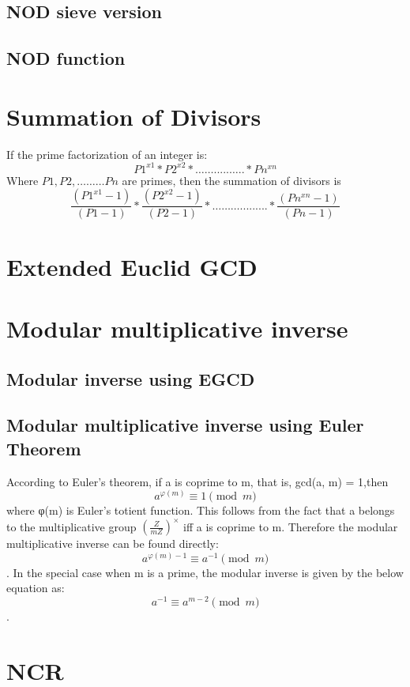 \documentclass[11pt]{report}
\begin{document}
\subsection{NOD sieve version}

\subsection{NOD function}

\section{Summation of Divisors}
If the prime factorization of an integer is:
		$$P1^{x1}*P2^{x2}*…….....…..*Pn^{xn}$$
Where $P1,P2,………Pn$ are primes, then the summation of divisors is
		$$\frac{(P1^{x1}  -1)}{(P1-1)} * \frac{(P2^{x2}  -1)}{(P2-1)} *………......... *\frac{(Pn^{xn}  -1)}{(Pn-1)}$$
\section{Extended Euclid GCD}

\section{Modular multiplicative inverse}
\subsection{Modular inverse using EGCD}

\subsection{Modular multiplicative inverse using Euler Theorem}
According to Euler's theorem, if a is coprime to m, that is, gcd(a, m) = 1,then
$$a^{\varphi(m)} \equiv 1 \pmod{m}$$
where φ(m) is Euler's totient function. This follows from the fact that a belongs to the multiplicative group $(\frac{Z}{mZ})^×$ iff a is coprime to m. Therefore the modular multiplicative inverse can be found directly:
$$a^{\varphi(m)-1} \equiv a^{-1} \pmod{m}$$.
In the special case when m is a prime, the modular inverse is given by the below equation as:
$$a^{-1} \equiv a^{m-2} \pmod{m}$$.
\section{NCR}
\end{document}
